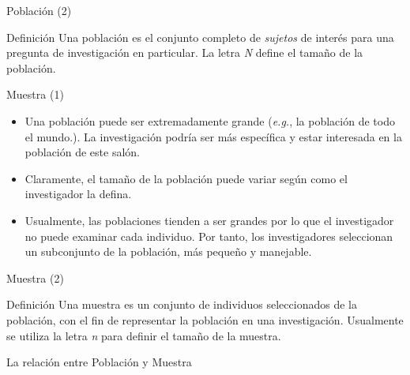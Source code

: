 \documentclass[xcolor=dvipsnames]{beamer}
\begin{document}
\begin{frame}{Población (2)}
\begin{block}{Definición}
\centering
Una población es el conjunto completo de \emph{sujetos} de interés para una pregunta de investigación en particular. La letra \emph{N} define el tamaño de la población.
\end{block}
\end{frame}

\begin{frame}{Muestra (1)}
\begin{itemize}
\justifying
\item Una población puede ser extremadamente grande (\emph{e.g.}, la población de todo el mundo.). La investigación podría ser más específica y estar interesada en la población de este salón.
\item Claramente, el tamaño de la población puede variar según como el investigador la defina. 
\item Usualmente, las poblaciones tienden a ser grandes por lo que el investigador no puede examinar cada individuo. Por tanto, los investigadores 	seleccionan un subconjunto de la población, más pequeño y manejable.
\end{itemize}
\end{frame}

\begin{frame}{Muestra (2)}
\begin{block}{Definición}
	\centering
	Una muestra es un conjunto de individuos seleccionados de la población, con el fin de representar la población en una investigación. Usualmente se utiliza la letra \emph{n} para definir el tamaño de la muestra. 
\end{block}
\end{frame}



\begin{frame}{La relación entre Población y Muestra}
\begin{center}
\end{center}		
\end{frame}
\end{document}
